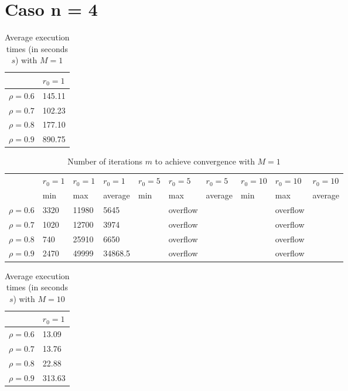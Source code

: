 \documentclass[a4paper,11pt,openright]{report}
\begin{document}
\section*{Caso n = 4} 
\begin{table}[H]
\centering
\addtolength{\leftskip}{-1.5cm}
\addtolength{\rightskip}{-1.5cm}
\begin{tabular}{|c|l|}
\hline
$ $ & $r_0 = 1$  \\
\hline
$\rho = 0.6$ & 145.11 \\

$\rho = 0.7$ & 102.23 \\

$\rho = 0.8$ & 177.10 \\

$\rho = 0.9$ & 890.75 \\
\hline
\end{tabular}
\caption{Average execution
 times (in seconds $s$) with $M = 1$}
\end{table}
\begin{table}[H]
\centering
\addtolength{\leftskip}{-1.5cm}
\addtolength{\rightskip}{-1.5cm}
\begin{tabular}{|c|lllllllll|}
\hline
$ $ & $r_0 = 1$ & $r_0 = 1$ & $r_0 = 1$ & $r_0 = 5$ & $r_0 = 5$ & $r_0 = 5$ & $r_0 = 10$ & $r_0 = 10$ & $r_0 = 10$  \\
$ $ & min & max & average & min & max & average & min & max & average \\ 
\hline
$\rho = 0.6$ & 3320 & 11980 & 5645 &  & overflow & &  & overflow &  \\

$\rho = 0.7$ & 1020 & 12700 & 3974 &  & overflow & &  & overflow &  \\

$\rho = 0.8$ & 740 & 25910 & 6650 &  & overflow & &  & overflow &  \\

$\rho = 0.9$ & 2470 & 49999 & 34868.5 &  & overflow & &  & overflow &  \\
\hline
\end{tabular}
\caption{Number of iterations $m$ to achieve convergence with $M = 1$}
\end{table}
\begin{table}[H]
\centering
\addtolength{\leftskip}{-1.5cm}
\addtolength{\rightskip}{-1.5cm}
\begin{tabular}{|c|l|}
\hline
$ $ & $r_0 = 1$  \\
\hline
$\rho = 0.6$ &  13.09 \\

$\rho = 0.7$ &  13.76 \\

$\rho = 0.8$ &  22.88 \\

$\rho = 0.9$ &  313.63 \\
\hline
\end{tabular}
\caption{Average execution
 times (in seconds $s$) with $M = 10$}
\end{table}
\end{document}
